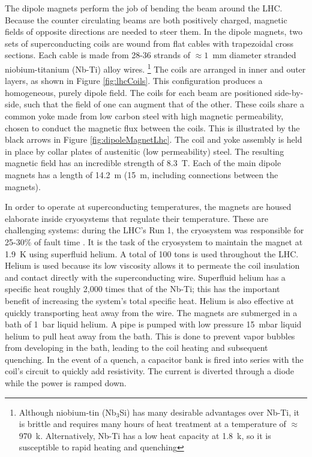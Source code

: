 The dipole magnets perform the job of bending the beam around the LHC.
Because the counter circulating beams are both positively charged, magnetic fields of opposite directions are needed to steer them.
In the dipole magnets, two sets of superconducting coils are wound from flat cables with trapezoidal cross sections.
Each cable is made from 28-36 strands of $\approx1$~mm diameter stranded niobium-titanium (Nb-Ti) alloy wires.
\footnote{Although niobium-tin (Nb$_3$Si) has many desirable advantages over Nb-Ti, it is brittle and requires many hours of heat treatment at a temperature of $\approx$970~k. Alternatively, Nb-Ti has a low heat capacity at 1.8~k, so it is susceptible to rapid heating and quenching}
The coils are arranged in inner and outer layers, as shown in Figure \ref{fig:lhcCoils}.
This configuration produces a homogeneous, purely dipole field.
The coils for each beam are positioned side-by-side, such that the field of one can augment that of the other.
These coils share a common yoke made from low carbon steel with high magnetic permeability, chosen to conduct the magnetic flux between the coils.
This is illustrated by the black arrows in Figure \ref{fig:dipoleMagnetLhc}.
The coil and yoke assembly is held in place by collar plates of austenitic (low permeability) steel.
The resulting magnetic field has an incredible strength of 8.3~T.
Each of the main dipole magnets has a length of 14.2~m (15~m, including connections between the magnets).

In order to operate at superconducting temperatures, the magnets are housed elaborate inside cryosystems that regulate their temperature.
These are challenging systems: during the LHC's Run 1, the cryosystem was responsible for 25-30\% of fault time \cite{lhcRun1}.
It is the task of the cryosystem to maintain the magnet at 1.9~K using superfluid helium. A total of 100 tons is used throughout the LHC.
Helium is used because its low viscosity allows it to permeate the coil insulation and contact directly with the superconducting wire.
Superfluid helium has a specific heat roughly 2,000 times that of the Nb-Ti; this has the important benefit of increasing the system's total specific heat.
Helium is also effective at quickly transporting heat away from the wire.
The magnets are submerged in a bath of 1~bar liquid helium. A pipe is pumped with low pressure 15~mbar liquid helium to pull heat away from the bath.
This is done to prevent vapor bubbles from developing in the bath, leading to the coil heating and subsequent quenching.
In the event of a quench, a capacitor bank is fired into series with the coil's circuit to quickly add resistivity. The current is diverted through a diode while the power is ramped down.

